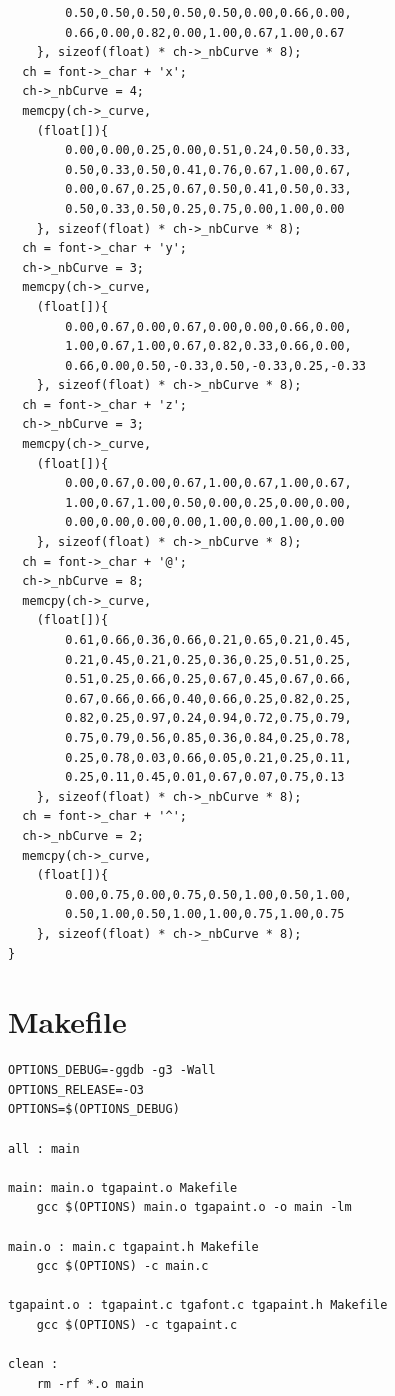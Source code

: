 \documentclass[12pt, a4paper]{article}
\begin{document}
\begin{scriptsize}
\begin{ttfamily}
\begin{lstlisting}
        0.50,0.50,0.50,0.50,0.50,0.00,0.66,0.00,
        0.66,0.00,0.82,0.00,1.00,0.67,1.00,0.67
    }, sizeof(float) * ch->_nbCurve * 8);
  ch = font->_char + 'x';
  ch->_nbCurve = 4;
  memcpy(ch->_curve, 
    (float[]){
        0.00,0.00,0.25,0.00,0.51,0.24,0.50,0.33,
        0.50,0.33,0.50,0.41,0.76,0.67,1.00,0.67,
        0.00,0.67,0.25,0.67,0.50,0.41,0.50,0.33,
        0.50,0.33,0.50,0.25,0.75,0.00,1.00,0.00
    }, sizeof(float) * ch->_nbCurve * 8);
  ch = font->_char + 'y';
  ch->_nbCurve = 3;
  memcpy(ch->_curve, 
    (float[]){
        0.00,0.67,0.00,0.67,0.00,0.00,0.66,0.00,
        1.00,0.67,1.00,0.67,0.82,0.33,0.66,0.00,
        0.66,0.00,0.50,-0.33,0.50,-0.33,0.25,-0.33
    }, sizeof(float) * ch->_nbCurve * 8);
  ch = font->_char + 'z';
  ch->_nbCurve = 3;
  memcpy(ch->_curve, 
    (float[]){
        0.00,0.67,0.00,0.67,1.00,0.67,1.00,0.67,
        1.00,0.67,1.00,0.50,0.00,0.25,0.00,0.00,
        0.00,0.00,0.00,0.00,1.00,0.00,1.00,0.00
    }, sizeof(float) * ch->_nbCurve * 8);
  ch = font->_char + '@';
  ch->_nbCurve = 8;
  memcpy(ch->_curve, 
    (float[]){
        0.61,0.66,0.36,0.66,0.21,0.65,0.21,0.45,
        0.21,0.45,0.21,0.25,0.36,0.25,0.51,0.25,
        0.51,0.25,0.66,0.25,0.67,0.45,0.67,0.66,
        0.67,0.66,0.66,0.40,0.66,0.25,0.82,0.25,
        0.82,0.25,0.97,0.24,0.94,0.72,0.75,0.79,
        0.75,0.79,0.56,0.85,0.36,0.84,0.25,0.78,
        0.25,0.78,0.03,0.66,0.05,0.21,0.25,0.11,
        0.25,0.11,0.45,0.01,0.67,0.07,0.75,0.13
    }, sizeof(float) * ch->_nbCurve * 8);
  ch = font->_char + '^';
  ch->_nbCurve = 2;
  memcpy(ch->_curve, 
    (float[]){
        0.00,0.75,0.00,0.75,0.50,1.00,0.50,1.00,
        0.50,1.00,0.50,1.00,1.00,0.75,1.00,0.75
    }, sizeof(float) * ch->_nbCurve * 8);
}
\end{lstlisting}
\end{ttfamily}
\end{scriptsize}

\section{Makefile}

\begin{scriptsize}
\begin{ttfamily}
\begin{lstlisting}
OPTIONS_DEBUG=-ggdb -g3 -Wall
OPTIONS_RELEASE=-O3
OPTIONS=$(OPTIONS_DEBUG)

all : main

main: main.o tgapaint.o Makefile
	gcc $(OPTIONS) main.o tgapaint.o -o main -lm

main.o : main.c tgapaint.h Makefile
	gcc $(OPTIONS) -c main.c

tgapaint.o : tgapaint.c tgafont.c tgapaint.h Makefile
	gcc $(OPTIONS) -c tgapaint.c

clean : 
	rm -rf *.o main
\end{lstlisting}
\end{ttfamily}
\end{scriptsize}
\end{document}
